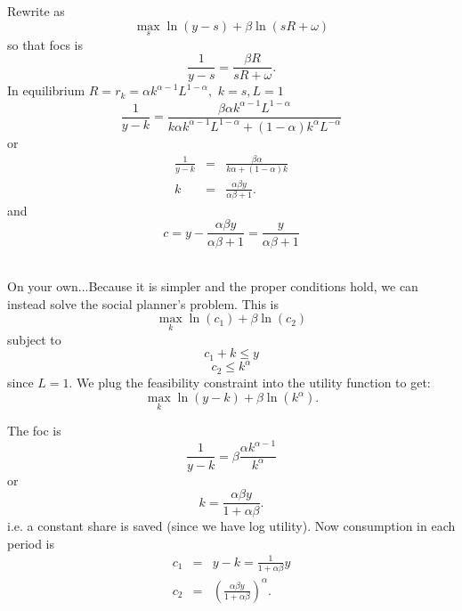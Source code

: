 \documentclass{sebase}
\begin{document}
Rewrite as%
\begin{equation*}
\underset{s}{\max }\ln \left( y-s\right) +\beta \ln \left( sR+\omega \right) 
\end{equation*}%
so that focs is%
\begin{equation*}
\frac{1}{y-s}=\frac{\beta R}{sR+\omega }.
\end{equation*}%
In equilibrium $R=r_{k}=\alpha k^{\alpha -1}L^{1-\alpha },$ $k=s,L=1$ 
\begin{equation*}
\frac{1}{y-k}=\frac{\beta \alpha k^{\alpha -1}L^{1-\alpha }}{k\alpha
k^{\alpha -1}L^{1-\alpha }+\left( 1-\alpha \right) k^{\alpha }L^{-\alpha }}
\end{equation*}%
or 
\begin{eqnarray*}
\frac{1}{y-k} &=&\frac{\beta \alpha }{k\alpha +\left( 1-\alpha \right) k} \\
k &=&\frac{\alpha \beta y}{\alpha \beta +1}.
\end{eqnarray*}%
and 
\begin{equation*}
c=y-\frac{\alpha \beta y}{\alpha \beta +1}=\frac{y}{\alpha \beta +1}
\end{equation*}
$\allowbreak $\pagebreak 

On your own...Because it is simpler and the proper conditions hold, we can
instead solve the social planner's problem. This is 
\begin{equation*}
\underset{k}{\max }\ln \left( c_{1}\right) +\beta \ln \left( c_{2}\right)
\end{equation*}%
subject to%
\begin{equation*}
c_{1}+k\leq y
\end{equation*}%
\begin{equation*}
c_{2}\leq k^{\alpha }
\end{equation*}%
since $L=1.$ We plug the feasibility constraint into the utility function to
get: 
\begin{equation*}
\underset{k}{\max }\ln \left( y-k\right) +\beta \ln \left( k^{\alpha
}\right) .
\end{equation*}

\pagebreak

The foc is 
\begin{equation*}
\frac{1}{y-k}=\beta \frac{\alpha k^{\alpha -1}}{k^{\alpha }}
\end{equation*}%
or%
\begin{equation*}
k=\frac{\alpha \beta y}{1+\alpha \beta }.
\end{equation*}%
i.e. a constant share is saved (since we have log utility). Now consumption
in each period is 
\begin{eqnarray*}
c_{1} &=&y-k=\frac{1}{1+\alpha \beta }y \\
c_{2} &=&\left( \frac{\alpha \beta y}{1+\alpha \beta }\right) ^{\alpha }.
\end{eqnarray*}
\end{document}
